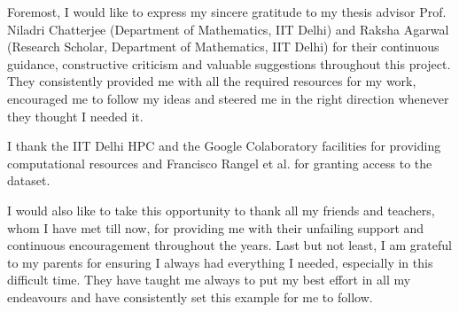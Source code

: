 
Foremost, I would like to express my sincere gratitude to my thesis advisor Prof. Niladri Chatterjee (Department of Mathematics, IIT Delhi) and Raksha Agarwal (Research Scholar, Department of Mathematics, IIT Delhi) for their continuous guidance, constructive criticism and valuable suggestions throughout this project.
They consistently provided me with all the required resources for my work, encouraged me to follow my ideas and steered me in the right direction whenever they thought I needed it.

I thank the IIT Delhi HPC and the Google Colaboratory facilities for providing computational resources and  Francisco Rangel et al. for granting access to the dataset.


I would also like to take this opportunity to thank all my friends and teachers, whom I have met till now, for providing me with their unfailing support and continuous encouragement throughout the years. Last but not least, I am grateful to my parents for ensuring I always had everything I needed, especially in this difficult time. They have taught me always to put my best effort in all my endeavours and have consistently set this example for me to follow.







